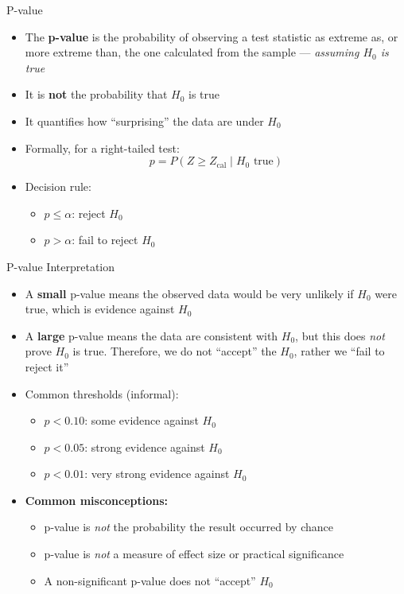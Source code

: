 \documentclass[12pt, aspectratio=169]{beamer}
\begin{document}
    \begin{frame}{P-value}
        \begin{itemize}
            \item The \textbf{p-value} is the probability of observing a test statistic
                as extreme as, or more extreme than, the one calculated from the sample ---
                \emph{assuming $H_0$ is true}
            \item It is \textbf{not} the probability that $H_0$ is true
            \item It quantifies how ``surprising'' the data are under $H_0$
            \item Formally, for a right-tailed test:
            \[
                p = P(Z \geqslant Z_{\text{cal}} \mid H_0 \text{ true})
            \]
            \item Decision rule:
            \begin{itemize}
                \item $p \leqslant \alpha$: reject $H_0$
                \item $p > \alpha$: fail to reject $H_0$
            \end{itemize}
        \end{itemize}
    \end{frame}


    \begin{frame}{P-value Interpretation}
        \begin{itemize}
            \item A \textbf{small} p-value means the observed data would be very
                unlikely if $H_0$ were true, which is evidence against $H_0$
            \item A \textbf{large} p-value means the data are consistent with $H_0$, but this does \emph{not} prove $H_0$ is true. Therefore, we do not ``accept'' the \(H_0\), rather we ``fail to reject it''
            \item Common thresholds (informal):
            \begin{itemize}
                \item $p < 0.10$: some evidence against $H_0$
                \item $p < 0.05$: strong evidence against $H_0$
                \item $p < 0.01$: very strong evidence against $H_0$
            \end{itemize}
            \item \textbf{Common misconceptions:}
            \begin{itemize}
                \item p-value is \emph{not} the probability the result occurred by chance
                \item p-value is \emph{not} a measure of effect size or practical significance
                \item A non-significant p-value does not ``accept'' $H_0$
            \end{itemize}
        \end{itemize}
    \end{frame}
\end{document}
